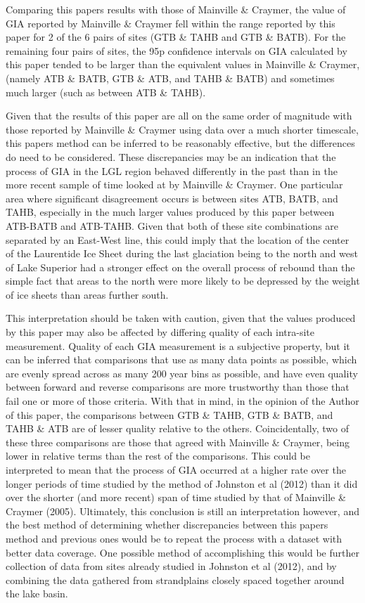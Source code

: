 Comparing this papers results with those of Mainville \& Craymer, the value of
GIA reported by Mainville \& Craymer fell within the range reported by this paper
for 2 of the 6 pairs of sites (GTB \& TAHB and GTB \& BATB). For the remaining
four pairs of sites, the 95p confidence intervals on GIA calculated by this paper
tended to be larger than the equivalent values in Mainville \& Craymer, 
(namely ATB \& BATB, GTB \& ATB, and TAHB \& BATB) and sometimes much larger
(such as between ATB \& TAHB).

Given that the results of this paper are all on the same order of magnitude with
those reported by Mainville \& Craymer using data over a much shorter timescale,
this papers method can be inferred to be reasonably effective, but the
differences do need to be considered. These discrepancies may be an indication 
that the process of GIA in the LGL region behaved differently in the past than
in the more recent sample of time looked at by Mainville \& Craymer. One
particular area where significant
disagreement occurs is between sites ATB, BATB, and TAHB, especially in the much
larger values produced by this paper between ATB-BATB and ATB-TAHB. Given that both
of these site combinations are separated by an East-West line, this could imply
that the location of the center of the Laurentide Ice Sheet during the last glaciation being to the
north and west of Lake Superior had a stronger effect on the overall process of
rebound than the simple fact that areas to the north were more likely to be
depressed by the weight of ice sheets than areas further south. 

This interpretation should be taken with caution, given that the values produced
by this paper
may also be affected by differing quality of each intra-site measurement. Quality
of each GIA measurement is a subjective property, but it can be inferred that comparisons
that use as many data points as possible, which are evenly spread across as many 
200 year bins as possible, and have even quality between forward 
and reverse comparisons are more trustworthy than those that fail one or more of
those criteria. With that in mind, in the opinion of the Author of this paper,
the comparisons between GTB \& TAHB, GTB \& BATB, and TAHB \& ATB are of lesser
quality relative to the others. Coincidentally, two of these three comparisons
are those that agreed with Mainville \& Craymer, being lower in relative terms than
the rest of the comparisons. This could be interpreted to mean that the process of
GIA occurred at a higher rate over the longer periods of time studied by the
method of Johnston et al (2012) than it did over the shorter (and more recent)
span of time studied by that of Mainville \& Craymer (2005). Ultimately, this
conclusion is still an interpretation however, and the best method of determining
whether discrepancies between this papers method and previous ones would be to 
repeat the process with a dataset with better data coverage. One possible method
of accomplishing this would be further collection of data from sites already studied
in Johnston et al (2012), and by combining the data gathered from strandplains
closely spaced together around the lake basin.
